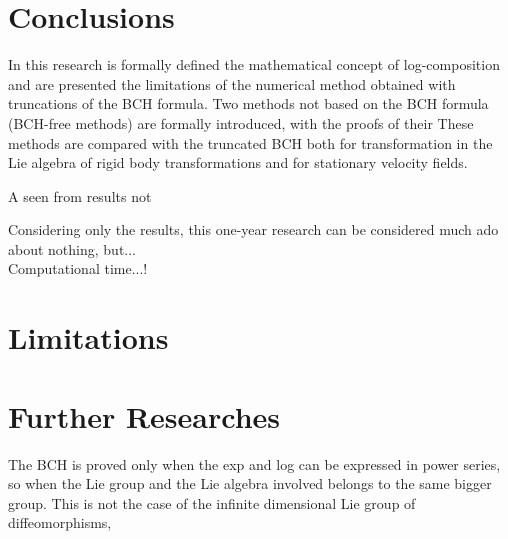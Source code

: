 \section{Conclusions}\label{se:conclusions}

In this research is formally defined the mathematical concept of log-composition and are presented the limitations of the numerical method obtained with truncations of the  BCH formula. Two methods not based on the BCH formula (BCH-free methods) are formally introduced, with the proofs of their 
These methods are compared with the truncated BCH both for transformation in the Lie algebra of rigid body transformations and for stationary velocity fields.



A seen from results not 


Considering only the results, this one-year research can be considered much ado about nothing, but...\\
Computational time...!


\section{Limitations}\label{se:limtations}

\section{Further Researches}\label{se:further_research}




The BCH is proved only when the exp and log can be expressed in power series, so when the Lie group and the Lie algebra involved belongs to the same bigger group. This is not the case of the infinite dimensional Lie group of diffeomorphisms,


